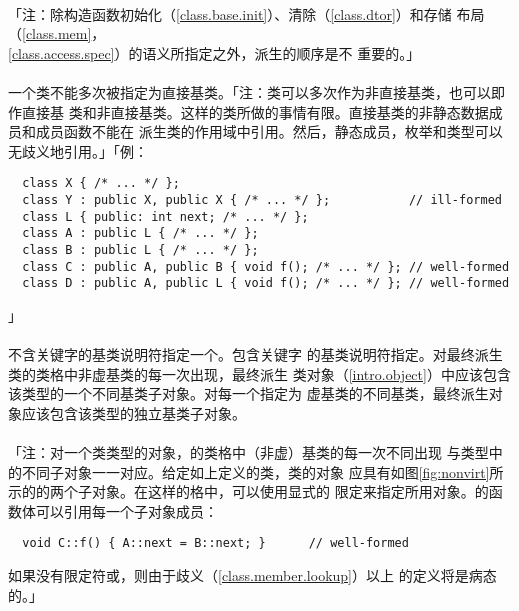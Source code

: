 \paragraph{}
「注：除构造函数初始化（\ref{class.base.init}）、清除（\ref{class.dtor}）和存储
布局（\ref{class.mem}，\ref{class.access.spec}）的语义所指定之外，派生的顺序是不
重要的。」

\paragraph{}
一个类不能多次被指定为直接基类。「注：类可以多次作为非直接基类，也可以即作直接基
类和非直接基类。这样的类所做的事情有限。直接基类的非静态数据成员和成员函数不能在
派生类的作用域中引用。然后，静态成员，枚举和类型可以无歧义地引用。」「例：
\begin{lstlisting}
  class X { /* ... */ };
  class Y : public X, public X { /* ... */ };           // ill-formed
  class L { public: int next; /* ... */ };
  class A : public L { /* ... */ };
  class B : public L { /* ... */ };
  class C : public A, public B { void f(); /* ... */ }; // well-formed
  class D : public A, public L { void f(); /* ... */ }; // well-formed
\end{lstlisting}」

\paragraph{}
不含关键字的基类说明符指定一个。包含关键字
的基类说明符指定。对最终派生类的类格中非虚基类的每一次出现，最终派生
类对象（\ref{intro.object}）中应该包含该类型的一个不同基类子对象。对每一个指定为
虚基类的不同基类，最终派生对象应该包含该类型的独立基类子对象。

\paragraph{}
「注：对一个类类型的对象，的类格中（非虚）基类的每一次不同出现
与类型中的不同子对象一一对应。给定如上定义的类，类的对象
应具有如图\ref{fig:nonvirt}所示的的两个子对象。在这样的格中，可以使用显式的
限定来指定所用对象。的函数体可以引用每一个子对象成员：
\begin{lstlisting}
  void C::f() { A::next = B::next; }      // well-formed
\end{lstlisting}
如果没有限定符或，则由于歧义（\ref{class.member.lookup}）以上
的定义将是病态的。」

